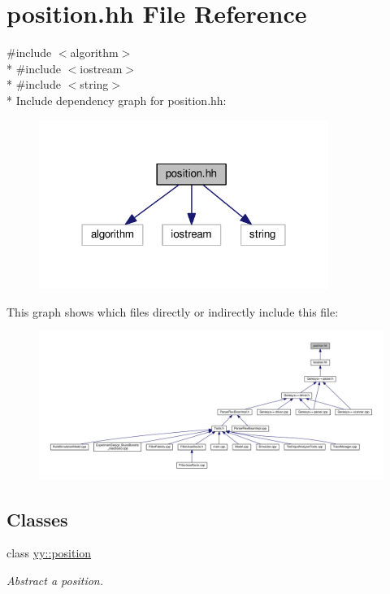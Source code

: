 \hypertarget{position_8hh}{\section{position.\-hh File Reference}
\label{position_8hh}
}
{\ttfamily \#include $<$algorithm$>$}\\*
{\ttfamily \#include $<$iostream$>$}\\*
{\ttfamily \#include $<$string$>$}\\*
Include dependency graph for position.\-hh\-:\nopagebreak
\begin{figure}[H]
\begin{center}
\leavevmode
\includegraphics[width=267pt]{position_8hh__incl}
\end{center}
\end{figure}
This graph shows which files directly or indirectly include this file\-:
\nopagebreak
\begin{figure}[H]
\begin{center}
\leavevmode
\includegraphics[width=350pt]{position_8hh__dep__incl}
\end{center}
\end{figure}
\subsection*{Classes}
\begin{DoxyCompactItemize}
\item 
class \hyperlink{classyy_1_1position}{yy\-::position}
\begin{DoxyCompactList}\small\item\em Abstract a position. \end{DoxyCompactList}\end{DoxyCompactItemize}
